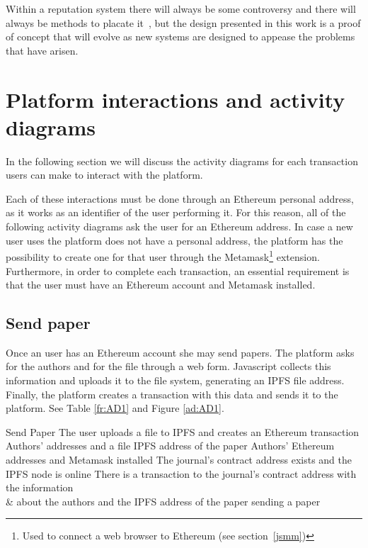 Within a reputation system there will always be some controversy and there will
always be methods to placate it~\cite{dellarocas2000immunizing}, but the design
presented in this work is a proof of concept that will evolve as new systems are
designed to appease the problems that have arisen.


\section{Platform interactions and activity diagrams}
\label{sec:funct-requ-activ}

In the following section we will discuss the activity diagrams for each
transaction users can make to interact with the platform.

Each of these interactions must be done through an Ethereum personal address, as
it works as an identifier of the user performing it. For this reason, all of the
following activity diagrams ask the user for an Ethereum address. In case a new
user uses the platform does not have a personal address, the platform has the
possibility to create one for that user through the Metamask\footnote{Used to
  connect a web browser to Ethereum (see section~\ref{jsmm})} extension.
Furthermore, in order to complete each transaction, an essential requirement is
that the user must have an Ethereum account and Metamask installed.

\subsection*{Send paper}

Once an user has an Ethereum account she may send papers. The platform asks for
the authors and for the file through a web form. Javascript collects this
information and uploads it to the file system, generating an IPFS file address.
Finally, the platform creates a transaction with this data and sends it to the
platform. See Table \ref{fr:AD1} and Figure \ref{ad:AD1}.

{Send Paper}%
{The user uploads a file to IPFS and creates an Ethereum
  transaction}%
{Authors' addresses and a file}%
{IPFS address of the paper}%
{Authors' Ethereum addresses and Metamask installed}%
{The journal's contract address exists and the IPFS node is
  online}%
{There is a transaction to the journal's contract address with the information\\
  & about the authors and the IPFS address of the paper }%
{sending a paper}%

